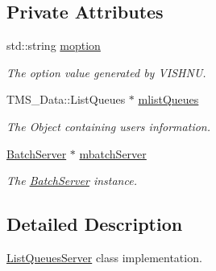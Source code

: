 \subsection*{Private Attributes}
\begin{DoxyCompactItemize}
\item 
\hypertarget{classListQueuesServer_abf9127ca126d9dfd793a4e6c50ca6486}{
std::string \hyperlink{classListQueuesServer_abf9127ca126d9dfd793a4e6c50ca6486}{moption}}
\label{classListQueuesServer_abf9127ca126d9dfd793a4e6c50ca6486}

\begin{DoxyCompactList}\small\item\em The option value generated by VISHNU. \item\end{DoxyCompactList}\item 
\hypertarget{classListQueuesServer_a49d392919bc0dba8a8821b6edd7e3efb}{
TMS\_\-Data::ListQueues $\ast$ \hyperlink{classListQueuesServer_a49d392919bc0dba8a8821b6edd7e3efb}{mlistQueues}}
\label{classListQueuesServer_a49d392919bc0dba8a8821b6edd7e3efb}

\begin{DoxyCompactList}\small\item\em The Object containing users information. \item\end{DoxyCompactList}\item 
\hypertarget{classListQueuesServer_a2ddc5df5f76b0a0d86ba17cf19c487d7}{
\hyperlink{classBatchServer}{BatchServer} $\ast$ \hyperlink{classListQueuesServer_a2ddc5df5f76b0a0d86ba17cf19c487d7}{mbatchServer}}
\label{classListQueuesServer_a2ddc5df5f76b0a0d86ba17cf19c487d7}

\begin{DoxyCompactList}\small\item\em The \hyperlink{classBatchServer}{BatchServer} instance. \item\end{DoxyCompactList}\end{DoxyCompactItemize}


\subsection{Detailed Description}
\hyperlink{classListQueuesServer}{ListQueuesServer} class implementation. 


